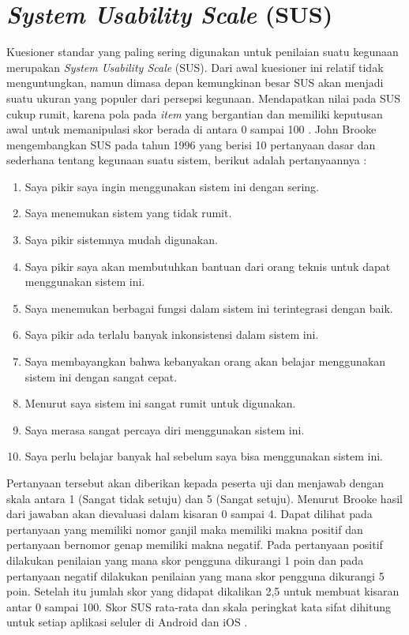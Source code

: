 \section{\textit{System Usability Scale }(SUS)}
Kuesioner standar yang paling sering digunakan untuk penilaian suatu kegunaan merupakan \textit{System Usability Scale} (SUS). Dari awal kuesioner ini relatif tidak menguntungkan, namun dimasa depan kemungkinan besar SUS akan menjadi suatu ukuran yang populer dari persepsi kegunaan. Mendapatkan nilai pada SUS cukup rumit, karena pola pada \textit{item} yang bergantian dan memiliki keputusan awal untuk memanipulasi skor berada di antara 0 sampai 100 \citep{lewis2018system}. John Brooke mengembangkan SUS pada tahun 1996 yang berisi 10 pertanyaan dasar dan sederhana tentang kegunaan suatu sistem, berikut adalah pertanyaannya \citep{kaya2019usability}:

\begin{enumerate}
\item Saya pikir saya ingin menggunakan sistem ini dengan sering.

\item Saya menemukan sistem yang tidak rumit.

\item Saya pikir sistemnya mudah digunakan.

\item Saya pikir saya akan membutuhkan bantuan dari orang teknis untuk dapat menggunakan sistem ini.

\item Saya menemukan berbagai fungsi dalam sistem ini terintegrasi dengan baik.

\item Saya pikir ada terlalu banyak inkonsistensi dalam sistem ini.

\item Saya membayangkan bahwa kebanyakan orang akan belajar menggunakan sistem ini dengan sangat cepat.

\item Menurut saya sistem ini sangat rumit untuk digunakan.

\item Saya merasa sangat percaya diri menggunakan sistem ini.

\item Saya perlu belajar banyak hal sebelum saya bisa menggunakan sistem ini.
\end{enumerate}


\par Pertanyaan tersebut akan diberikan kepada peserta uji dan menjawab dengan skala antara 1 (Sangat tidak setuju) dan 5 (Sangat setuju). Menurut Brooke hasil dari jawaban akan dievaluasi dalam kisaran 0 sampai 4. Dapat dilihat pada pertanyaan yang memiliki nomor ganjil maka memiliki makna positif dan pertanyaan bernomor genap memiliki makna negatif. Pada pertanyaan positif dilakukan penilaian yang mana skor pengguna dikurangi 1 poin dan pada pertanyaan negatif dilakukan penilaian yang mana skor pengguna dikurangi 5 poin. Setelah itu jumlah skor yang didapat dikalikan 2,5 untuk membuat kisaran antar 0 sampai 100. Skor SUS rata-rata dan skala peringkat kata sifat dihitung untuk setiap aplikasi seluler di Android dan iOS \citep{kaya2019usability}.


